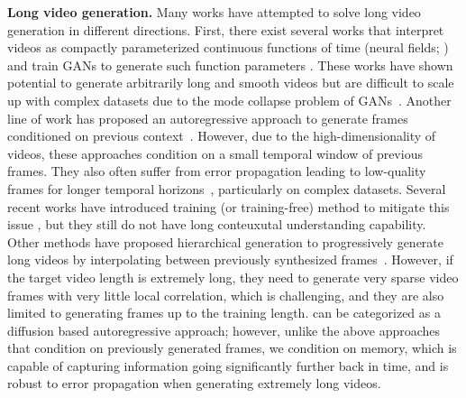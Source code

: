\vspace{0.02in}
\noindent\textbf{Long video generation.}
Many works have attempted to solve long video generation in different directions. First, there exist several works that interpret videos as compactly parameterized continuous functions of time (neural fields; \citep{sitzmann2020implicit}) and train GANs \citep{goodfellow2014generative} to generate such function parameters \citep{yu2022digan,skorokhodov2021stylegan}. These works have shown potential to generate arbitrarily long and smooth videos but are difficult to scale up with complex datasets due to the mode collapse problem of GANs~\citep{srivastava2017veegan}. Another line of work has proposed an autoregressive approach to generate frames conditioned on previous context~\citep{blattmann2023align,gupta2023photorealistic,yan2023temporally,weng2023art,ge2022long,villegas2023phenaki,yan2021videogpt,kondratyuk2023videopoet}. However, due to the high-dimensionality of videos, these approaches condition on a small temporal window of previous frames. They also often suffer from error propagation leading to low-quality frames for longer
temporal horizons~\citep{huang2023video}, particularly on complex datasets.
Several recent works have introduced training (or training-free) method to mitigate this issue \citep{ruhe2024rolling, kim2024fifo, chen2024diffusion, xie2024progressive,lu2024freelong}, but they still do not have long conteuxutal understanding capability.
Other methods have proposed hierarchical generation to progressively generate long videos by interpolating between previously synthesized frames~\citep{yin2023nuwa,huang2023video}. However, if the target video length is extremely long, they need to generate very sparse video frames with very little local correlation, which is challenging, and they are also limited to generating frames up to the training length. \sname can be categorized as a diffusion based
autoregressive approach; however, unlike the above approaches that condition on previously generated frames, we condition on memory, which is capable of capturing information going significantly further back in time, and is robust to error propagation when generating extremely long videos.

